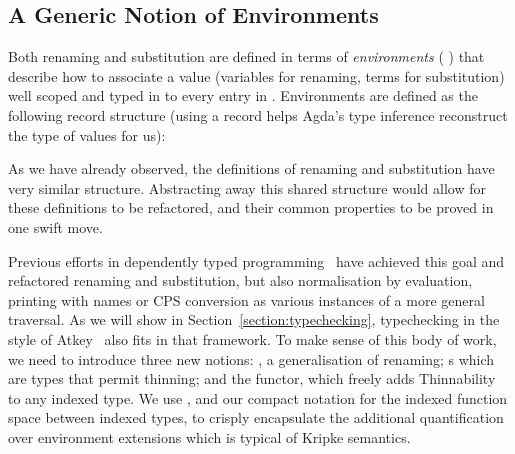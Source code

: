 \subsection{A Generic Notion of Environments}

Both renaming and substitution are defined in terms of \emph{environments}
{( )  } that describe how to associate a value 
(variables for renaming, terms for substitution) well scoped and typed in 
to every entry in . Environments are defined as the following record
structure (using a record helps Agda's type inference reconstruct the type of
values  for us):

\begin{center}
\end{center}

As we have already observed, the definitions of renaming and substitution have very
similar structure. Abstracting away this shared structure would allow for these
definitions to be refactored, and their common properties to be proved in one swift
move.

Previous efforts in dependently typed
programming~\cite{benton2012strongly,allais2017type}
have achieved this goal and refactored renaming and substitution,
but also normalisation by evaluation, printing with names or CPS conversion
as various instances of a more general traversal. As we will show in Section~\ref{section:typechecking},
typechecking in the style of Atkey~\citeyear{atkey2015algebraic} also
fits in that framework. To make sense of this body of work, we
need to introduce three new notions: , a generalisation of
renaming; s which are types that permit thinning; and the
 functor, which freely adds Thinnability to any indexed type.
We use , and our compact notation for the indexed function space
between indexed types, to crisply encapsulate the additional quantification
over environment extensions which is typical of Kripke semantics.
\label{def:thinning}
\begin{center}
\end{center}

